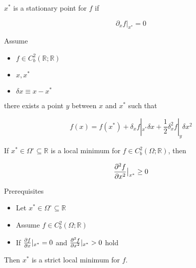 \begin{definition}
    
    $x^*$ is a stationary point for $f$ if

    \begin{equation}
        \partial_xf|_{x^*} = 0
    \end{equation}
\end{definition}

\begin{theorem}
    
    Assume
    \begin{itemize}
        \item $f\in C^2_b(\mathbb{R};\mathbb{R})$
        \item $x,x^*$
        \item $\delta x\equiv x-x^*$
    \end{itemize}
    
    there exists a point $y$ between $x$ and $x^*$ such that

    \begin{equation}
        f(x) = f(x^*) + \delta_x f|_{x^*}\delta x + \frac{1}{2}\delta^2_xf|_y\delta x^2
    \end{equation}

\end{theorem}

\begin{theorem}
    
    If $x^* \in \Omega^\circ \subseteq \mathbb{R}$ is a local minimum for $f\in C^2_b(\Omega;\mathbb{R})$, then

    \begin{equation}
        \pdv[2]{f}{x}\big|_{x^*} \ge 0
    \end{equation}

\end{theorem}

\begin{theorem}
    
    Prerequisites
    \begin{itemize}
        \item Let $x^* \in \Omega^\circ \subseteq \mathbb{R}$
        \item Assume $f \in C^2_b(\Omega;\mathbb{R})$
        \item If $\pdv{f}{x}|_{x^*} = 0$ and $\pdv[2]{f}{x}|_{x^*} > 0$ hold
    \end{itemize}

    Then $x^*$ is a strict local minimum for $f$.
\end{theorem}

